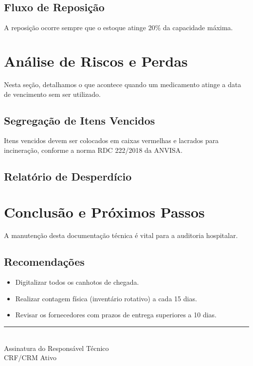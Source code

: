 \documentclass[12pt,a4paper]{article}
\begin{document}
\subsection{Fluxo de Reposição}
A reposição ocorre sempre que o estoque atinge 20\% da capacidade máxima. 
\lipsum[1-2] %

\newpage

\section{Análise de Riscos e Perdas}
Nesta seção, detalhamos o que acontece quando um medicamento atinge a data de vencimento sem ser utilizado.

\subsection{Segregação de Itens Vencidos}
Itens vencidos devem ser colocados em caixas vermelhas e lacrados para incineração, conforme a norma RDC 222/2018 da ANVISA.

\subsection{Relatório de Desperdício}
\lipsum[3-5] %

\newpage

\section{Conclusão e Próximos Passos}
A manutenção desta documentação técnica é vital para a auditoria hospitalar. 

\subsection{Recomendações}
\begin{itemize}
    \item Digitalizar todos os canhotos de chegada.
    \item Realizar contagem física (inventário rotativo) a cada 15 dias.
    \item Revisar os fornecedores com prazos de entrega superiores a 10 dias.
\end{itemize}

\vspace{2cm}
\begin{center}
\rule{8cm}{0.4pt} \\
Assinatura do Responsável Técnico \\
CRF/CRM Ativo
\end{center}
\end{document}
